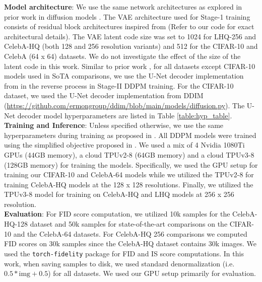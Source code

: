 \documentclass[10pt]{article} \usepackage[accepted]{tmlr}
\begin{document}
\noindent
\textbf{Model architecture}: We use the same network architectures as explored in prior work in diffusion models \citep{ho2020denoising, dhariwal2021diffusion, nichol2021improved}. The VAE architecture used for Stage-1 training consists of residual block architectures inspired from \citep{child2021deep} (Refer to our code for exact architectural details). The VAE latent code size was set to 1024 for LHQ-256 and CelebA-HQ (both 128 and 256 resolution variants) and 512 for the CIFAR-10 and CelebA (64 x 64) datasets. We do not investigate the effect of the size of the latent code in this work. Similar to prior work \citep{ho2020denoising}, for all datasets except CIFAR-10 models used in SoTA comparisons, we use the U-Net \citep{ronneberger2015unet} decoder implementation from \citep{nichol2021improved} in the reverse process in Stage-II DDPM training. For the CIFAR-10 dataset, we used the U-Net decoder implementation from DDIM \citep{song2021denoising} (\url{https://github.com/ermongroup/ddim/blob/main/models/diffusion.py}). The U-Net decoder model hyperparameters are listed in Table \ref{table:hyp_table}.\\

\noindent
\textbf{Training and Inference}: Unless specified otherwise, we use the same hyperparameters during training as proposed in \citep{ho2020denoising}. All DDPM models were trained using the simplified objective proposed in \citep{ho2020denoising}. We used a mix of 4 Nvidia 1080Ti GPUs (44GB memory), a cloud TPUv2-8 (64GB memory) and a cloud TPUv3-8 (128GB memory) for training the models. Specifically, we used the GPU setup for training our CIFAR-10 and CelebA-64 models while we utilized the TPUv2-8 for training CelebA-HQ models at the 128 x 128 resolutions. Finally, we utilized the TPUv3-8 model for training on CelebA-HQ and LHQ models at 256 x 256 resolution.\\

\noindent
\textbf{Evaluation}: For FID \citep{heusel2018gans} score computation, we utilized 10k samples for the CelebA-HQ-128 dataset and 50k samples for state-of-the-art comparisons on the CIFAR-10 and the CelebA-64 datasets. For CelebA-HQ 256 comparisons we computed FID scores on 30k samples since the CelebA-HQ dataset contains 30k images. We used the \texttt{torch-fidelity} \citep{obukhov2020torchfidelity} package for FID and IS score computations. In this work, when saving samples to disk, we used standard denormalization (i.e. $0.5 * \text{img} + 0.5$) for all datasets. We used our GPU setup primarily for evaluation.
\end{document}
